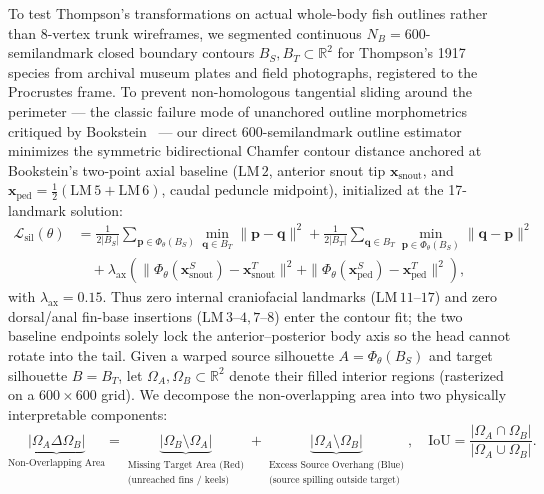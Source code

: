 \documentclass[11pt,a4paper]{article}
\theoremstyle{definition}
\theoremstyle{remark}
\newcommand{\R}{\mathbb{R}}
\newcommand{\IoU}{\mathrm{IoU}}
\begin{document}
To test Thompson's transformations on actual whole-body fish outlines rather than 8-vertex trunk wireframes, we segmented continuous $N_B = 600$-semilandmark closed boundary contours $B_S, B_T \subset \R^2$ for Thompson's 1917 species from archival museum plates and field photographs, registered to the Procrustes frame. To prevent non-homologous tangential sliding around the perimeter --- the classic failure mode of unanchored outline morphometrics critiqued by Bookstein~\cite{Bookstein1978,Bookstein1997,Bookstein2023} --- our direct 600-semilandmark outline estimator minimizes the symmetric bidirectional Chamfer contour distance anchored at Bookstein's two-point axial baseline ($\mathrm{LM}\,2$, anterior snout tip $\mathbf{x}_{\mathrm{snout}}$, and $\mathbf{x}_{\mathrm{ped}} = \tfrac{1}{2}(\mathrm{LM}\,5 + \mathrm{LM}\,6)$, caudal peduncle midpoint), initialized at the 17-landmark solution:
\begin{align}
  \mathcal{L}_{\mathrm{sil}}(\theta) &= \frac{1}{2|B_S|}\sum_{\mathbf{p} \in \Phi_\theta(B_S)} \min_{\mathbf{q} \in B_T} \|\mathbf{p} - \mathbf{q}\|^2 + \frac{1}{2|B_T|}\sum_{\mathbf{q} \in B_T} \min_{\mathbf{p} \in \Phi_\theta(B_S)} \|\mathbf{q} - \mathbf{p}\|^2 \nonumber\\
  &\quad + \lambda_{\mathrm{ax}}\!\left(\|\Phi_\theta(\mathbf{x}_{\mathrm{snout}}^S) - \mathbf{x}_{\mathrm{snout}}^T\|^2 + \|\Phi_\theta(\mathbf{x}_{\mathrm{ped}}^S) - \mathbf{x}_{\mathrm{ped}}^T\|^2\right),
\end{align}
with $\lambda_{\mathrm{ax}} = 0.15$. Thus zero internal craniofacial landmarks ($\mathrm{LM}\,11\text{--}17$) and zero dorsal/anal fin-base insertions ($\mathrm{LM}\,3\text{--}4, 7\text{--}8$) enter the contour fit; the two baseline endpoints solely lock the anterior--posterior body axis so the head cannot rotate into the tail. Given a warped source silhouette $A = \Phi_\theta(B_S)$ and target silhouette $B = B_T$, let $\Omega_A, \Omega_B \subset \R^2$ denote their filled interior regions (rasterized on a $600 \times 600$ grid). We decompose the non-overlapping area into two physically interpretable components:
\begin{equation}
  \underbrace{|\Omega_A \Delta \Omega_B|}_{\text{Non-Overlapping Area}} = \underbrace{|\Omega_B \setminus \Omega_A|}_{\substack{\text{Missing Target Area (Red)}\\ \text{(unreached fins / keels)}}} + \underbrace{|\Omega_A \setminus \Omega_B|}_{\substack{\text{Excess Source Overhang (Blue)}\\ \text{(source spilling outside target)}}}, \quad \IoU = \frac{|\Omega_A \cap \Omega_B|}{|\Omega_A \cup \Omega_B|}.
\end{equation}
\end{document}
